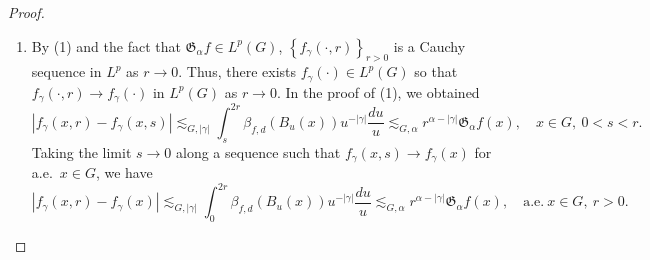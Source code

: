 \documentclass[11pt,reqno]{amsart}
\newcommand{\1}{\mathbf 1}
\begin{document}
\begin{proof}
\begin{enumerate}
\begin{align*}
&\lesssim_\alpha r^{\alpha-\left|\gamma\right|}\mathfrak{G}_\alpha f\left(x\right),\quad x\in G,~0<s<r.
\end{align*}
Also, for $0<r<1$, $\left|f_\gamma\left(x,r\right)\right|\le \left|f_\gamma\left(x,r\right)-f_\gamma\left(x,1\right)\right|+\left|f_\gamma\left(x,1\right)\right|\lesssim_{G,\alpha} \mathfrak{G}_\alpha f\left(x\right)+Mf\left(x\right)$, where the latter inequality used the fact that $f_\gamma\left(x,1\right)$ is given as the integral of $f$ multiplied by a polynomial determined by $\gamma$ and $\lfloor\alpha\rfloor$, namely \eqref{eq:adxr-integral}. In particular, this implies that $f_\gamma\left(\cdot,r\right)\in L^p$, and that
\[
\left\|f_\gamma\left(\cdot,r\right)\right\|_{L^p\left(G\right)}\lesssim_{G,\alpha} \left\|\mathfrak{G}_\alpha f\right\|_{L^p\left(G\right)}+\left\|f\right\|_{L^p\left(G\right)}.
\]
    \item By (1) and the fact that $\mathfrak{G}_\alpha f\in L^p\left(G\right)$, $\left\{f_\gamma\left(\cdot,r\right)\right\}_{r>0} $ is a Cauchy sequence in $L^p$ as $r\to 0$. Thus, there exists $f_\gamma\left(\cdot\right)\in L^p\left(G\right)$ so that $f_\gamma \left(\cdot,r\right)\to f_\gamma \left(\cdot\right)$ in $L^p\left(G\right)$ as $r\to 0$. In the proof of (1), we obtained
    \[
    \left|f_\gamma \left(x,r\right)-f_\gamma\left(x,s\right)\right|\lesssim_{G,\left|\gamma\right|} \int_{s}^{2r} \beta_{f,d}\left(B_u\left(x\right)\right)u^{-\left|\gamma\right|}\frac{du}{u}\lesssim_{G,\alpha} r^{\alpha-\left|\gamma\right|}\mathfrak{G}_\alpha f\left(x\right),\quad x\in G,~0<s<r.
    \]
    Taking the limit $s\to 0$ along a sequence such that $f_\gamma\left(x,s\right)\to f_\gamma\left(x\right)$ for a.e.~$x\in G$, we have
    \[
    \left|f_\gamma \left(x,r\right)-f_\gamma\left(x\right)\right|\lesssim_{G,\left|\gamma\right|} \int_{0}^{2r} \beta_{f,d}\left(B_u\left(x\right)\right)u^{-\left|\gamma\right|}\frac{du}{u}\lesssim_{G,\alpha} r^{\alpha-\left|\gamma\right|}\mathfrak{G}_\alpha f\left(x\right),\quad \mathrm{a.e.}~x\in G,~r>0.
    \]
    

\end{enumerate}
\end{proof}
\end{document}
